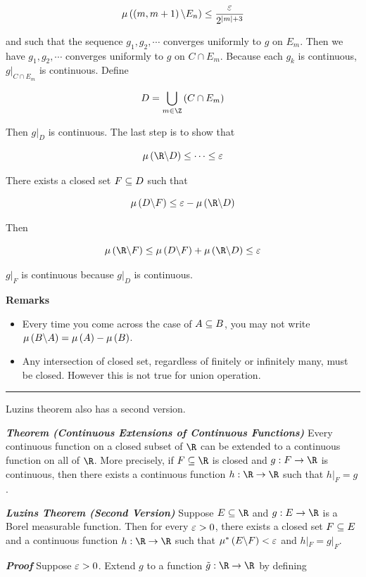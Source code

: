 \documentclass[
]{article}
\begin{document}
\[\mu\left(\left(m,m+1\right)\backslash E_n\right)\le \frac{\varepsilon}{2^{\left|{m}\right|+3}}\]

and such that the sequence \(g_1,g_2,\cdots\) converges uniformly to
\(g\) on \(E_m\). Then we have \(g_1,g_2,\cdots\) converges uniformly to
\(g\) on \(C\cap E_m\). Because each \(g_k\) is continuous,
\(g|_{C\cap E_m}\) is continuous. Define

\[D = \bigcup_{m\in \Z}\pr{C\cap E_m}\]

Then \(g|_D\) is continuous. The last step is to show that

\[\lm{\R\c D}\le \cdots \le \ve\]

There exists a closed set \(F\subseteq D\) such that

\[\lm{D\c F}\le \ve-\lm{\R\c D}\]

Then

\[\lm{\R\c F}\le \lm{D\c F}+\lm{\R\c D}\le \ve\]

\(g|_F\) is continuous because \(g|_D\) is continuous.

\textbf{Remarks}

\begin{itemize}
\item
  Every time you come across the case of \(A\subseteq B\), you may not write
  \(\mu\left(B\backslash A\right) = \mu\left(A\right)-\mu\left(B\right)\).
\item
  Any intersection of closed set, regardless of finitely or infinitely
  many, must be closed. However this is not true for union operation.
\end{itemize}

\begin{center}\rule{0.5\linewidth}{0.5pt}\end{center}

Luzin\textquotesingle s theorem also has a second version.

\emph{\textbf{Theorem (Continuous Extensions of Continuous Functions)}}
Every continuous function on a closed subset of \(\R\) can be extended
to a continuous function on all of \(\R\). More precisely, if
\(F\se \R\) is closed and \(g:F\to \R\) is continuous, then there exists
a continuous function \(h:\R\to \R\) such that \(h|_F = g\).

\emph{\textbf{Luzin\textquotesingle s Theorem (Second Version)}} Suppose
\(E\se \R\) and \(g:E\to \R\) is a Borel measurable function. Then for
every \(\varepsilon>0\), there exists a closed set \(F\subseteq E\) and a continuous
function \(h:\R\to \R\) such that \(\mu^*\left(E\backslash F\right)<\varepsilon\) and
\(h|_F = g|_F\).

\emph{\textbf{Proof}} Suppose \(\varepsilon>0\). Extend \(g\) to a function
\(\tilde g:\R\to \R\) by defining
\end{document}
